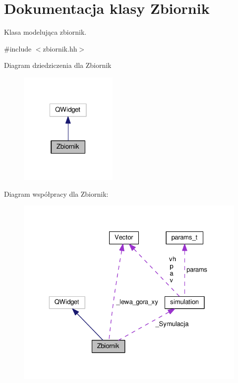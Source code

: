 \hypertarget{class_zbiornik}{\section{Dokumentacja klasy Zbiornik}
\label{class_zbiornik}
}


Klasa modelująca zbiornik.  




{\ttfamily \#include $<$zbiornik.\-hh$>$}



Diagram dziedziczenia dla Zbiornik\nopagebreak
\begin{figure}[H]
\begin{center}
\leavevmode
\includegraphics[width=134pt]{class_zbiornik__inherit__graph}
\end{center}
\end{figure}


Diagram współpracy dla Zbiornik\-:\nopagebreak
\begin{figure}[H]
\begin{center}
\leavevmode
\includegraphics[width=325pt]{class_zbiornik__coll__graph}
\end{center}
\end{figure}
